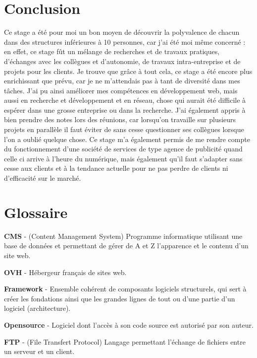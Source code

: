 \documentclass[report]{tnreport}
\begin{document}
\chapter{Conclusion}

Ce stage a été pour moi un bon moyen de découvrir la polyvalence de chacun dans des structures inférieures à 10 personnes, car j’ai été moi même concerné : en effet, ce stage fût un mélange de recherches et de travaux pratiques, d’échanges avec les collègues et d’autonomie, de travaux intra-entreprise et de projets pour les clients. Je trouve que grâce à tout cela, ce stage a été encore plus enrichissant que prévu, car je ne m’attendais pas à tant de diversité dans mes tâches. J’ai pu ainsi améliorer mes compétences en développement web, mais aussi en recherche et développement et en réseau, chose qui aurait été difficile à espérer dans une grosse entreprise ou dans la recherche. J’ai également appris à bien prendre des notes lors des réunions, car lorsqu’on travaille sur plusieurs projets en parallèle il faut éviter de sans cesse questionner ses collègues lorsque l’on a oublié quelque chose. Ce stage m’a également permis de me rendre compte du fonctionnement d’une société de services de type agence de publicité quand celle ci arrive à l’heure du numérique, mais également qu’il faut s’adapter sans cesse aux clients et à la tendance actuelle pour ne pas perdre de clients ni d’efficacité sur le marché.







\listoffigures


\chapter*{Glossaire}
\textbf{CMS} - (Content Management System) Programme informatique utilisant une base de données et permettant de gérer de A et Z l'apparence et le contenu d'un site web.

\textbf{OVH} - Hébergeur français de sites web.

\textbf{Framework} - Ensemble cohérent de composants logiciels structurels, qui sert à créer les fondations ainsi que les grandes lignes de tout ou d’une partie d'un logiciel (architecture).

\textbf{Opensource} -  Logiciel dont l'accès à son code source est autorisé par son auteur. 

\textbf{FTP} - (File Transfert Protocol) Langage permettant l'échange de fichiers entre un serveur et un client.
\end{document}
